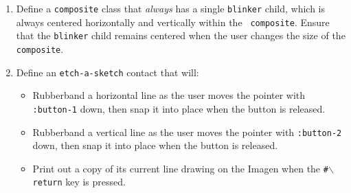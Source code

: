 \begin{enumerate}
\item Define a {\tt composite} class that {\em always} has a single {\tt blinker}
child, which is always centered horizontally and vertically within the {\tt
composite}. Ensure that the {\tt blinker} child
remains centered when the user changes the size of the {\tt composite}.

\item Define an {\tt etch-a-sketch} contact that will:
\begin{itemize}
\item 
Rubberband a horizontal
line as the user moves the pointer with {\tt :button-1} down, then
snap it into place when the button is released.
\item Rubberband a vertical
line as the user moves the pointer with {\tt :button-2} down, then
snap it into place when the button is released.
\item Print out a copy of its current line drawing on the Imagen
when the {\tt \#$\backslash$return} key is pressed.

\end{itemize}

\end{enumerate}
\pagebreak
